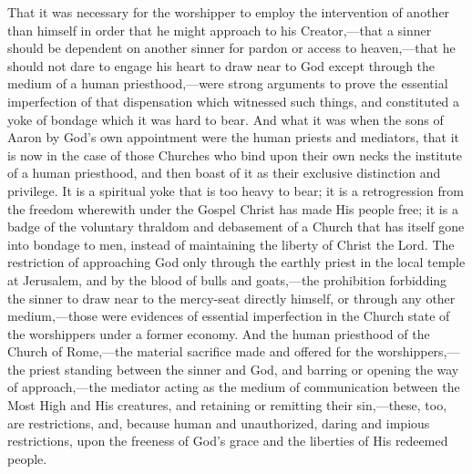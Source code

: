 \documentclass[
  english,
]{book}
\begin{document}
That it was necessary for the worshipper to employ the intervention of another than himself in order that he might approach to his Creator,---that a sinner should be dependent on another sinner for pardon or access to heaven,---that he should not dare to engage his heart to draw near to God except through the medium of a human priesthood,---were strong arguments to prove the essential imperfection of that dispensation which witnessed such things, and constituted a yoke of bondage which it was hard to bear. And what it was when the sons of Aaron by God's own appointment were the human priests and mediators, that it is now in the case of those Churches who bind upon their own necks the institute of a human priesthood, and then boast of it as their exclusive distinction and privilege. It is a spiritual yoke that is too heavy to bear; it is a retrogression from the freedom wherewith under the Gospel Christ has made His people free; it is a badge of the voluntary thraldom and debasement of a Church that has itself gone into bondage to men, instead of maintaining the liberty of Christ the Lord. The restriction of approaching God only through the earthly priest in the local temple at Jerusalem, and by the blood of bulls and goats,---the prohibition forbidding the sinner to draw near to the mercy-seat directly himself, or through any other medium,---those were evidences of essential imperfection in the Church state of the worshippers under a former economy. And the human priesthood of the Church of Rome,---the material sacrifice made and offered for the worshippers,---the priest standing between the sinner and God, and barring or opening the way of approach,---the mediator acting as the medium of communication between the Most High and His creatures, and retaining or remitting their sin,---these, too, are restrictions, and, because human and unauthorized, daring and impious restrictions, upon the freeness of God's grace and the liberties of His redeemed people.
\end{document}
